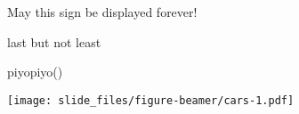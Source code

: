 \documentclass[
  ignorenonframetext,
]{beamer}
\newenvironment{Shaded}{\begin{snugshade}}{\end{snugshade}}
\newcommand{\FunctionTok}[1]{\textcolor[rgb]{0.00,0.00,0.00}{#1}}
\newcommand{\NormalTok}[1]{#1}
\let\oldShaded\Shaded
\let\endoldShaded\endShaded
\renewenvironment{Shaded}{\footnotesize\oldShaded}{\endoldShaded}
\begin{document}
\begin{frame}{May this sign be displayed forever!}
\protect\hypertarget{may-this-sign-be-displayed-forever}{}
\vspace*{-4pt}
\end{frame}

\begin{frame}[fragile]{last but not least}
\protect\hypertarget{last-but-not-least}{}
\begin{Shaded}
\begin{Highlighting}[]
\FunctionTok{piyopiyo}\NormalTok{()}
\end{Highlighting}
\end{Shaded}

\texttt{[image: slide\_files/figure-beamer/cars-1.pdf]}
\end{frame}
\end{document}

